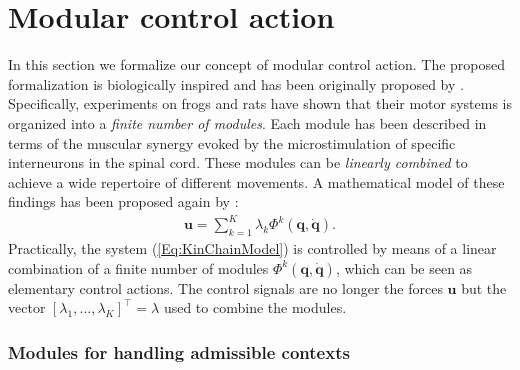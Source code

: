 \documentclass{svmult}
\begin{document}
\section{Modular control action}

In this section we formalize our concept of modular control action.
The proposed formalization is biologically inspired and has been
originally proposed by \cite{BizziMussa-Ivaldi}. Specifically,
experiments on frogs and rats have shown that their motor systems is
organized into a {\em finite number of modules}.  Each module has
been described in terms of the muscular synergy evoked by the
microstimulation of specific interneurons in the spinal cord. These
modules can be {\em linearly combined} to achieve a wide repertoire
of different movements. A mathematical model of these findings has
been proposed again by \cite{BizziMussa-Ivaldi}:
\begin{eqnarray} \label{Eq:BasicModelControlv2}
\mathbf u = \sum_{k=1}^K \lambda_k \Phi^k(\mathbf q, \dot{\mathbf
q}).
\end{eqnarray}
Practically, the system (\ref{Eq:KinChainModel}) is controlled by
means of a linear combination of a finite number of modules
$\Phi^k(\mathbf q, \dot{\mathbf q})$, which can be seen as
elementary control actions. The control signals are no longer the
forces $\mathbf u$ but the vector $\left[ \lambda_1, \dots,
\lambda_K \right]^\top = \lambda$ used to combine the modules.

\subsubsection{Modules for handling admissible contexts} \label{Sec:ModContexts}
\end{document}
